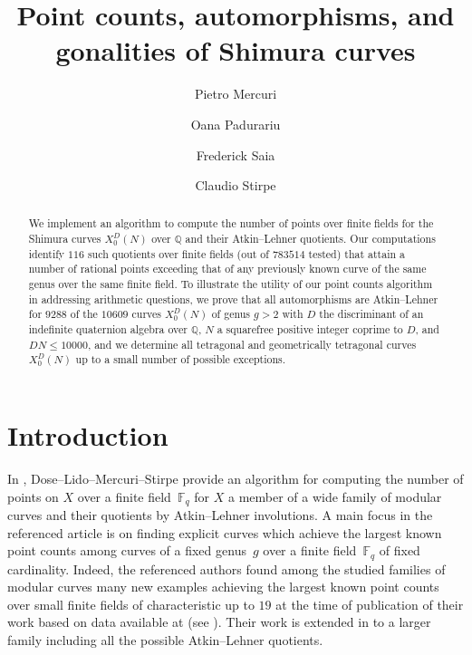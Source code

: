 \documentclass[11pt,reqno]{amsart}
\title{Point counts, automorphisms, and gonalities of Shimura curves}
\author{\sc Pietro Mercuri}
\author{\sc Oana Padurariu}
\author{\sc Frederick Saia}
\author{\sc Claudio Stirpe}
\newcommand{\F}{\mathbb{F}}
\theoremstyle{definition}
\begin{document}


\begin{abstract}
We implement an algorithm to compute the number of points over finite fields for the Shimura curves $X_0^D(N)$ over $\mathbb{Q}$ and their Atkin--Lehner quotients. Our computations identify $116$ such quotients over finite fields (out of $783514$ tested) that attain a number of rational points exceeding that of any previously known curve of the same genus over the same finite field. To illustrate the utility of our point counts algorithm in addressing arithmetic questions, we prove that all automorphisms are Atkin--Lehner for $9288$ of the $10609$ curves $X_0^D(N)$ of genus $g > 2$ with $D$ the discriminant of an indefinite quaternion algebra over $\mathbb{Q}$, $N$ a squarefree positive integer coprime to $D$, and $DN\leq 10000$, and we determine all tetragonal and geometrically tetragonal curves $X_0^D(N)$ up to a small number of possible exceptions. 
\end{abstract}

\setcounter{tocdepth}{1}
\maketitle





\section{Introduction}\label{section: introduction}

In \cite{DLMS}, Dose--Lido--Mercuri--Stirpe provide an algorithm for computing the number of points on $X$ over a finite field~$\F_q$ for $X$ a member of a wide family of modular curves and their quotients by Atkin--Lehner involutions. A main focus in the referenced article is on finding explicit curves which achieve the largest known point counts among curves of a fixed genus~$g$ over a finite field~$\F_q$ of fixed cardinality. Indeed, the referenced authors found among the studied families of modular curves many new examples achieving the largest known point counts over small finite fields of characteristic up to $19$ at the time of publication of their work based on data available at \cite{ManyPoints} (see \cite[\S 6]{DLMS}). Their work is extended in \cite{DLMS26} to a larger family including all the possible Atkin--Lehner quotients.
\end{document}
